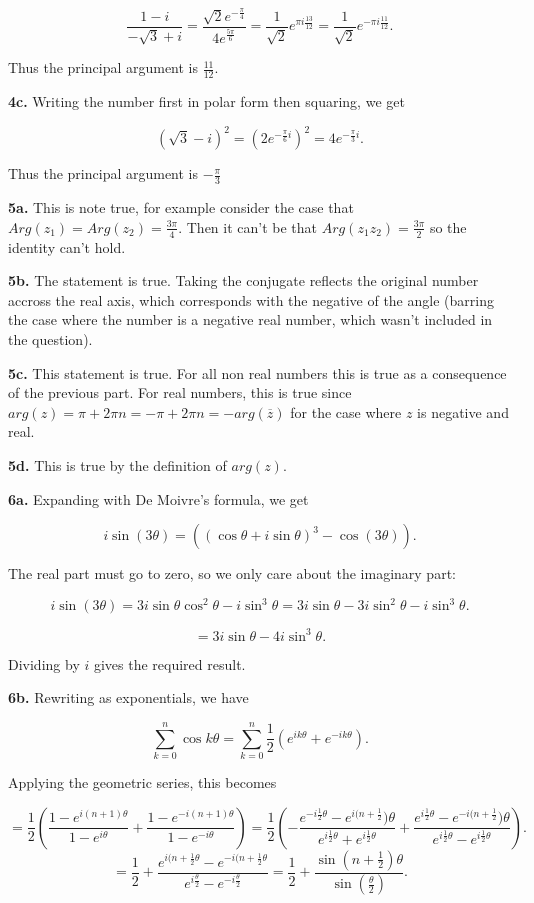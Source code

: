 \documentclass[letterpaper, reqno,11pt]{article}
\begin{document}
\[
    \frac{1-i}{-\sqrt{3} +i}=\frac{\sqrt{2} e^{-\frac{\pi}{4}}}{4e^{\frac{5\pi}{6}}}=\frac{1}{\sqrt{2} }e^{\pi i \frac{13}{12}}=\frac{1}{\sqrt{2} }e^{-\pi i \frac{11}{12}}
.\] 

Thus the principal argument is $\frac{11}{12}$. 

{\noindent\bf 4c.} Writing the number first in polar form then squaring, we get 

\[
    (\sqrt{3} -i)^2=(2e^{-\frac{\pi}{6}i})^2=4e^{-\frac{\pi}{3}i}
.\] 

Thus the principal argument is $-\frac{\pi}{3}$

{\noindent\bf 5a.} This is note true, for example consider the case that $Arg(z_1)=Arg(z_2)=\frac{3\pi}{4}$. Then it can't be that $Arg(z_1z_2)=\frac{3\pi}{2}$ so the identity can't hold. 

{\noindent\bf 5b.} The statement is true. Taking the conjugate reflects the original number accross the real axis, which corresponds with the negative of the angle (barring the case where the number is a negative real number, which wasn't included in the question). 

{\noindent\bf 5c.} This statement is true. For all non real numbers this is true as a consequence of the previous part. For real numbers, this is true since $arg(z)=\pi+2\pi n=-\pi+2\pi n=-arg(\overline{z})$ for the case where $z$ is negative and real. 

{\noindent\bf 5d.} This is true by the definition of $arg(z)$. 

{\noindent\bf 6a.} Expanding with De Moivre's formula, we get 

\[
i\sin(3\theta)=((\cos\theta+i\sin\theta)^3-\cos(3\theta))
.\] 

The real part must go to zero, so we only care about the imaginary part:

\[
i\sin(3\theta)=3i\sin\theta\cos^2\theta-i\sin^3\theta=3i\sin\theta-3i\sin^2\theta-i\sin^3\theta
.\] 

\[
=3i\sin\theta-4i\sin^3\theta
.\] 

Dividing by $i$ gives the required result. 

{\noindent\bf 6b.} Rewriting as exponentials, we have 

\[
\sum_{k=0}^{n} \cos k\theta=\sum_{k=0}^{n} \frac{1}{2}\left( e^{ik\theta}+e^{-ik\theta} \right) 
.\] 

Applying the geometric series, this becomes

\[
=\frac{1}{2}\left( \frac{1-e^{i(n+1)\theta}}{1-e^{i\theta}}+\frac{1-e^{-i(n+1)\theta}}{1-e^{-i\theta}} \right)=\frac{1}{2}\left( -\frac{e^{-i\frac{1}{2}\theta}-e^{i(n+\frac{1}{2}})\theta}{e^{i\frac{1}{2}\theta}+e^{ i \frac{1}{2}\theta}} +\frac{e^{i\frac{1}{2}\theta}-e^{-i(n+\frac{1}{2}})\theta}{e^{i\frac{1}{2}\theta}-e^{ i \frac{1}{2}\theta}}\right) 
.\] 
\[
=\frac{1}{2}+\frac{e^{i(n+\frac{1}{2}\theta}-e^{-i(n+\frac{1}{2}\theta}}{e^{i\frac{\theta}{2}}-e^{-i\frac{\theta}{2}}}=\frac{1}{2}+\frac{\sin(n+\frac{1}{2})\theta}{\sin(\frac{\theta}{2})}
.\] 
\end{document}
